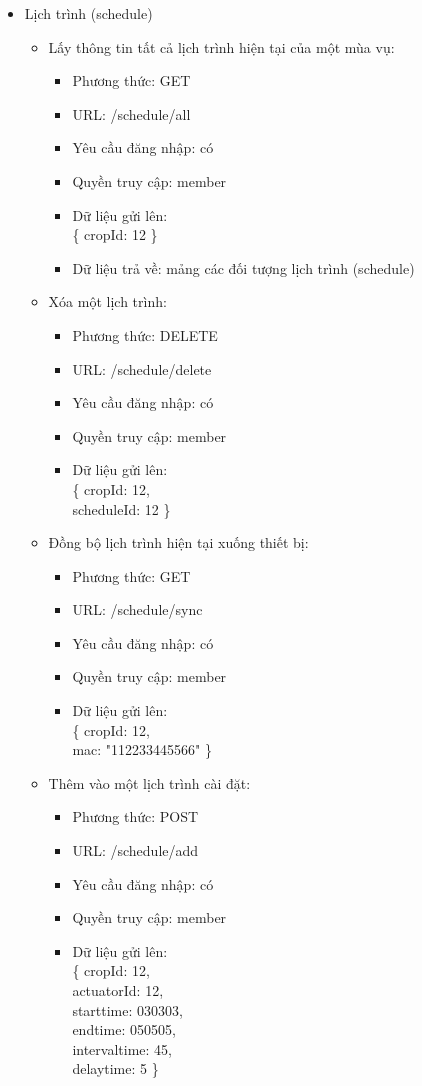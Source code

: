 \documentclass[a4paper,12pt,oneside]{article}
\begin{document}
\begin{itemize}
\item Lịch trình (schedule)
\begin{itemize}
\item Lấy thông tin tất cả lịch trình hiện tại của một mùa vụ:
	\begin{itemize}
	\item Phương thức: GET
	\item URL: /schedule/all
	\item Yêu cầu đăng nhập: có
	\item Quyền truy cập: member
	\item Dữ liệu gửi lên:\\ 
		\{
  			cropId: 12
		\}
	\item Dữ liệu trả về: mảng các đối tượng lịch trình (schedule)
	\end{itemize} 
	
\item Xóa một lịch trình:
	\begin{itemize}
	\item Phương thức: DELETE
	\item URL: /schedule/delete
	\item Yêu cầu đăng nhập: có
	\item Quyền truy cập: member
	\item Dữ liệu gửi lên:\\ 
		\{
  			cropId: 12,\\
  			scheduleId: 12
		\}
	\end{itemize} 
	
\item Đồng bộ lịch trình hiện tại xuống thiết bị:
	\begin{itemize}
	\item Phương thức: GET
	\item URL: /schedule/sync
	\item Yêu cầu đăng nhập: có
	\item Quyền truy cập: member
	\item Dữ liệu gửi lên:\\ 
		\{
  			cropId: 12,\\
  			mac: "112233445566"
		\}
	\end{itemize} 
	
\item Thêm vào một lịch trình cài đặt:
	\begin{itemize}
	\item Phương thức: POST
	\item URL: /schedule/add
	\item Yêu cầu đăng nhập: có
	\item Quyền truy cập: member
	\item Dữ liệu gửi lên:\\ 
		\{
  			cropId: 12,\\
 			actuatorId: 12,\\
  			starttime: 030303,\\
 			endtime: 050505,\\
  			intervaltime: 45,\\
  			delaytime: 5
		\}


\end{itemize}
\end{itemize}
\end{itemize}
\end{document}
